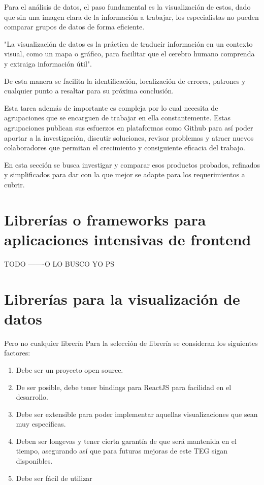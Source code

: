 Para el análisis de datos, el paso fundamental es la visualización de estos, dado que sin una imagen clara de la información a trabajar, los especialistas no pueden comparar grupos de datos de forma eficiente. 

"La visualización de datos es la práctica de traducir información en un contexto visual, como un mapa o gráfico, para facilitar que el cerebro humano comprenda y extraiga información útil". \cite{DefinitionDataViz}

De esta manera se facilita la identificación, localización de errores, patrones y cualquier punto a resaltar para su próxima conclusión.

Esta tarea además de importante es compleja por lo cual necesita de agrupaciones que se encarguen de trabajar en ella constantemente. Estas agrupaciones publican sus esfuerzos en plataformas como Github para así poder aportar a la investigación, discutir soluciones, revisar problemas y atraer nuevos colaboradores que permitan el crecimiento y consiguiente eficacia del trabajo.

En esta sección se busca investigar y comparar esos productos probados, refinados y simplificados para dar con la que mejor se adapte para los requerimientos a cubrir. 

\section{Librerías o frameworks para aplicaciones intensivas de frontend}

TODO
-------O LO BUSCO YO PS

\section{Librerías para la visualización de datos}
Pero no cualquier librería 
Para la selección de librería se consideran los siguientes factores:

\begin{enumerate}
    \item {Debe ser un proyecto open source.}
    \item {De ser posible, debe tener bindings para ReactJS para facilidad en el desarrollo.}
    \item {Debe ser extensible para poder implementar aquellas visualizaciones que sean muy específicas.}
    \item {Deben ser longevas y tener cierta garantía de que será mantenida en el tiempo,
    asegurando así que para futuras mejoras de este TEG sigan disponibles.}
    \item {Debe ser fácil de utilizar}
\end{enumerate}

